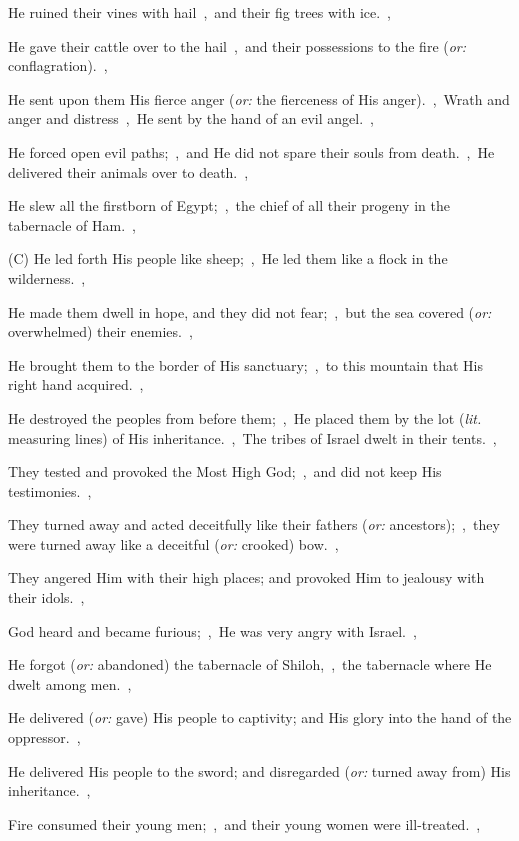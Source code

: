 \documentclass[12pt,twoside,a5paper]{article}
\newcommand{\translationoption}[1]{\emph{or:} #1}
\newcommand{\translationliteral}[1]{\emph{lit.} #1}
\begin{document}
\begin{normalparskip}
  He ruined their vines with hail~\sep\ and their fig trees with ice.~\sep

  He gave their cattle over to the hail~\sep\ and their possessions to the fire (\translationoption{conflagration}).~\sep

  He sent upon them His fierce anger (\translationoption{the fierceness of His anger}).~\sep\ Wrath and anger and distress~\sep\ He sent by the hand of an evil angel.~\sep

  He forced open evil paths;~\sep\ and He did not spare their souls from death.~\sep\ He delivered their animals over to death.~\sep

  He slew all the firstborn of Egypt;~\sep\ the chief of all their progeny in the tabernacle of Ham.~\sep

  (C) He led forth His people like sheep;~\sep\ He led them like a flock in the wilderness.~\sep

  He made them dwell in hope, and they did not fear;~\sep\ but the sea covered (\translationoption{overwhelmed}) their enemies.~\sep

  He brought them to the border of His sanctuary;~\sep\ to this mountain that His right hand acquired.~\sep

  He destroyed the peoples from before them;~\sep\ He placed them by the lot (\translationliteral{measuring lines}) of His inheritance.~\sep\ The tribes of Israel dwelt in their tents.~\sep

  They tested and provoked the Most High God;~\sep\ and did not keep His testimonies.~\sep

  They turned away and acted deceitfully like their fathers (\translationoption{ancestors});~\sep\ they were turned away like a deceitful (\translationoption{crooked}) bow.~\sep

  They angered Him with their high places; and provoked Him to jealousy with their idols.~\sep

  God heard and became furious;~\sep\ He was very angry with Israel.~\sep

  He forgot (\translationoption{abandoned}) the tabernacle of Shiloh,~\sep\ the tabernacle where He dwelt among men.~\sep

  He delivered (\translationoption{gave}) His people to captivity; and His glory into the hand of the oppressor.~\sep

  He delivered His people to the sword; and disregarded (\translationoption{turned away from}) His inheritance.~\sep

  Fire consumed their young men;~\sep\ and their young women were ill-treated.~\sep


\end{normalparskip}
\end{document}
